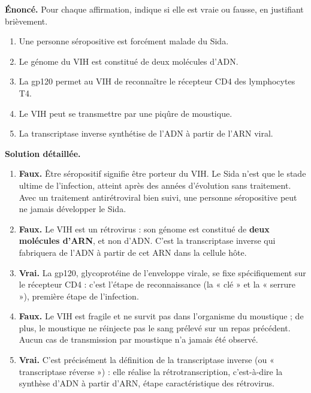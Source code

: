 \documentclass[11pt]{article}
\begin{document}
\begin{exoresolu}
\textbf{Énoncé.} Pour chaque affirmation, indique si elle est vraie ou fausse, en justifiant brièvement.
\begin{enumerate}
\item Une personne séropositive est forcément malade du Sida.
\item Le génome du VIH est constitué de deux molécules d'ADN.
\item La gp120 permet au VIH de reconnaître le récepteur CD4 des lymphocytes T4.
\item Le VIH peut se transmettre par une piqûre de moustique.
\item La transcriptase inverse synthétise de l'ADN à partir de l'ARN viral.
\end{enumerate}
\tcblower
\textbf{Solution détaillée.}
\begin{enumerate}
\item \textbf{Faux.} Être séropositif signifie être porteur du VIH. Le Sida n'est que le stade ultime de l'infection, atteint après des années d'évolution sans traitement. Avec un traitement antirétroviral bien suivi, une personne séropositive peut ne jamais développer le Sida.
\item \textbf{Faux.} Le VIH est un rétrovirus : son génome est constitué de \textbf{deux molécules d'ARN}, et non d'ADN. C'est la transcriptase inverse qui fabriquera de l'ADN à partir de cet ARN dans la cellule hôte.
\item \textbf{Vrai.} La gp120, glycoprotéine de l'enveloppe virale, se fixe spécifiquement sur le récepteur CD4 : c'est l'étape de reconnaissance (la « clé » et la « serrure »), première étape de l'infection.
\item \textbf{Faux.} Le VIH est fragile et ne survit pas dans l'organisme du moustique ; de plus, le moustique ne réinjecte pas le sang prélevé sur un repas précédent. Aucun cas de transmission par moustique n'a jamais été observé.
\item \textbf{Vrai.} C'est précisément la définition de la transcriptase inverse (ou « transcriptase réverse ») : elle réalise la rétrotranscription, c'est-à-dire la synthèse d'ADN à partir d'ARN, étape caractéristique des rétrovirus.
\end{enumerate}
\end{exoresolu}
\end{document}
